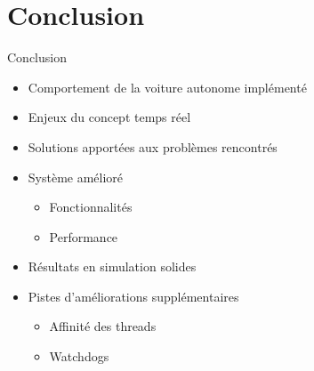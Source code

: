 \documentclass{beamer}
\begin{document}
\section{Conclusion}

\begin{frame}{Conclusion}
    \begin{itemize}
        \item Comportement de la voiture autonome implémenté
        \item Enjeux du concept temps réel
        \item Solutions apportées aux problèmes rencontrés
        \item Système amélioré
        \begin{itemize}
            \item Fonctionnalités
            \item Performance
        \end{itemize}
        \item Résultats en simulation solides
        \item Pistes d’améliorations supplémentaires
         \begin{itemize}
            \item Affinité des threads
            \item Watchdogs
        \end{itemize}
    \end{itemize}
\end{frame}
\end{document}

